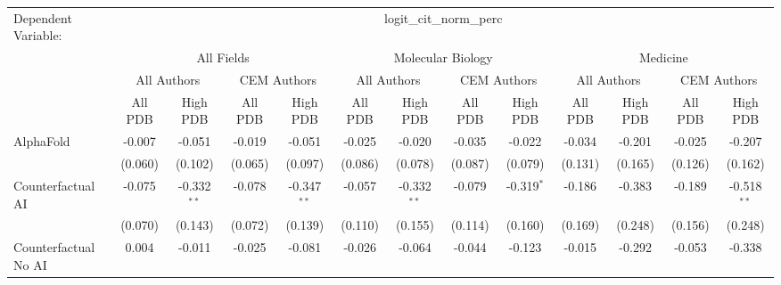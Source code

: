 \begingroup
\centering
\begin{tabular}{lcccccccccccc}
   \tabularnewline \midrule \midrule
   Dependent Variable: & \multicolumn{12}{c}{logit\_cit\_norm\_perc}\\
 & \multicolumn{4}{c}{All Fields} & \multicolumn{4}{c}{Molecular Biology} & \multicolumn{4}{c}{Medicine} \\
\cmidrule(lr){2-5} \cmidrule(lr){6-9} \cmidrule(lr){10-13}
 & \multicolumn{2}{c}{All Authors} & \multicolumn{2}{c}{CEM Authors} & \multicolumn{2}{c}{All Authors} & \multicolumn{2}{c}{CEM Authors} & \multicolumn{2}{c}{All Authors} & \multicolumn{2}{c}{CEM Authors} \\
\cmidrule(lr){2-3} \cmidrule(lr){4-5} \cmidrule(lr){6-7} \cmidrule(lr){8-9} \cmidrule(lr){10-11} \cmidrule(lr){12-13}
 & \multicolumn{1}{c}{All PDB} & \multicolumn{1}{c}{High PDB} & \multicolumn{1}{c}{All PDB} & \multicolumn{1}{c}{High PDB} & \multicolumn{1}{c}{All PDB} & \multicolumn{1}{c}{High PDB} & \multicolumn{1}{c}{All PDB} & \multicolumn{1}{c}{High PDB} & \multicolumn{1}{c}{All PDB} & \multicolumn{1}{c}{High PDB} & \multicolumn{1}{c}{All PDB} & \multicolumn{1}{c}{High PDB} \\
\cmidrule(lr){2-2} \cmidrule(lr){3-3} \cmidrule(lr){4-4} \cmidrule(lr){5-5} \cmidrule(lr){6-6} \cmidrule(lr){7-7} \cmidrule(lr){8-8} \cmidrule(lr){9-9} \cmidrule(lr){10-10} \cmidrule(lr){11-11} \cmidrule(lr){12-12} \cmidrule(lr){13-13}
   AlphaFold                                                  & -0.007  & -0.051        & -0.019  & -0.051        & -0.025  & -0.020        & -0.035  & -0.022       & -0.034  & -0.201  & -0.025        & -0.207\\   
                                                              & (0.060) & (0.102)       & (0.065) & (0.097)       & (0.086) & (0.078)       & (0.087) & (0.079)      & (0.131) & (0.165) & (0.126)       & (0.162)\\   
   Counterfactual AI                                          & -0.075  & -0.332$^{**}$ & -0.078  & -0.347$^{**}$ & -0.057  & -0.332$^{**}$ & -0.079  & -0.319$^{*}$ & -0.186  & -0.383  & -0.189        & -0.518$^{**}$\\   
                                                              & (0.070) & (0.143)       & (0.072) & (0.139)       & (0.110) & (0.155)       & (0.114) & (0.160)      & (0.169) & (0.248) & (0.156)       & (0.248)\\   
   Counterfactual No AI                                       & 0.004   & -0.011        & -0.025  & -0.081        & -0.026  & -0.064        & -0.044  & -0.123       & -0.015  & -0.292  & -0.053        & -0.338\\   

\end{tabular}
